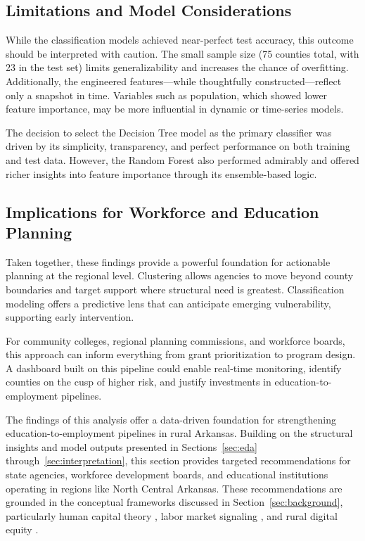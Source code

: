 \documentclass{llncs}
\begin{document}
\subsection{Limitations and Model Considerations}
While the classification models achieved near-perfect test accuracy, this outcome should be interpreted with caution. The small sample size (75 counties total, with 23 in the test set) limits generalizability and increases the chance of overfitting. Additionally, the engineered features—while thoughtfully constructed—reflect only a snapshot in time. Variables such as population, which showed lower feature importance, may be more influential in dynamic or time-series models.

The decision to select the Decision Tree model as the primary classifier was driven by its simplicity, transparency, and perfect performance on both training and test data. However, the Random Forest also performed admirably and offered richer insights into feature importance through its ensemble-based logic.


\subsection{Implications for Workforce and Education Planning}
Taken together, these findings provide a powerful foundation for actionable planning at the regional level. Clustering allows agencies to move beyond county boundaries and target support where structural need is greatest. Classification modeling offers a predictive lens that can anticipate emerging vulnerability, supporting early intervention.

For community colleges, regional planning commissions, and workforce boards, this approach can inform everything from grant prioritization to program design. A dashboard built on this pipeline could enable real-time monitoring, identify counties on the cusp of higher risk, and justify investments in education-to-employment pipelines.

The findings of this analysis offer a data-driven foundation for strengthening education-to-employment pipelines in rural Arkansas. Building on the structural insights and model outputs presented in Sections~\ref{sec:eda} through~\ref{sec:interpretation}, this section provides targeted recommendations for state agencies, workforce development boards, and educational institutions operating in regions like North Central Arkansas. These recommendations are grounded in the conceptual frameworks discussed in Section~\ref{sec:background}, particularly human capital theory \cite{becker_humancapital_1975}, labor market signaling \cite{linde_signalling_2025}, and rural digital equity \cite{WHITACRE20141011,urban2023,NTIA2023}.
\end{document}
